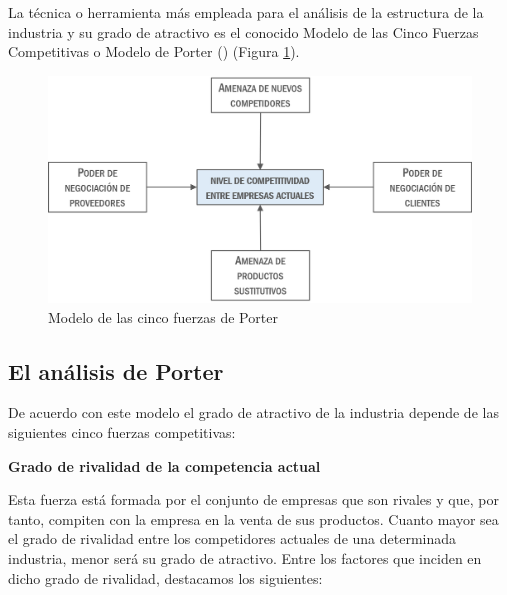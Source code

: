 \documentclass[
]{krantz}
\begin{document}
La técnica o herramienta más empleada para el análisis de la estructura de la industria y su grado de atractivo es el conocido Modelo de las Cinco Fuerzas Competitivas o Modelo de Porter (\citet{porter1982}) (Figura \ref{fig:18a-02}).

\begin{figure}

{\centering \includegraphics[width=0.5\linewidth]{images/18a-02} 

}

\caption{Modelo de las cinco fuerzas de Porter}\label{fig:18a-02}
\end{figure}

\hypertarget{el-anuxe1lisis-de-porter}{%
\subsection{El análisis de Porter}\label{el-anuxe1lisis-de-porter}}

De acuerdo con este modelo el grado de atractivo de la industria depende de las siguientes cinco fuerzas competitivas:

\textbf{Grado de rivalidad de la competencia actual}

Esta fuerza está formada por el conjunto de empresas que son rivales y que, por tanto, compiten con la empresa en la venta de sus productos. Cuanto mayor sea el grado de rivalidad entre los competidores actuales de una determinada industria, menor será su grado de atractivo. Entre los factores que inciden en dicho grado de rivalidad, destacamos los siguientes:
\end{document}
